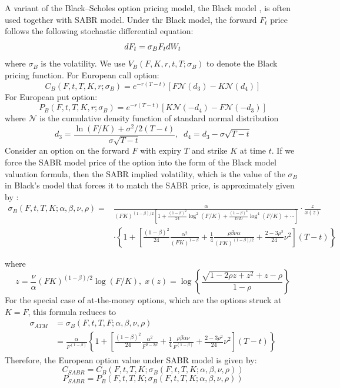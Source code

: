 \documentclass[letterpaper,12pt,titlepage,oneside,final]{book}
\numberwithin{equation}{section}
\theoremstyle{definition}
\begin{document}
A variant of the Black–Scholes option pricing model, the Black model \cite{black1976pricing}, is often used together with SABR model. Under thr Black model, the  forward $F_t$ price follows the following stochastic differential equation:
\[
dF_t=\sigma_B F_t dW_t\\
\]
where $\sigma_B$ is the volatility. We use $V_B(F,K,r,t,T;\sigma_{B})$ to denote the Black pricing function. For European call option:
\[
C_B(F,t,T,K,r;\sigma_{B})=e^{-r(T-t)}[F \mathcal{N} (d_3)-K  \mathcal{N} (d_4)]
\]
For European put option:
\[
P_B(F,t,T,K,r;\sigma_{B})=e^{-r(T-t)}[K  \mathcal{N} (-d_4)-F  \mathcal{N} (-d_3)]
\]
where $\mathcal{N}$ is the cumulative density function of standard normal distribution
\[
d_3=\frac{\ln(F/K)+\sigma^2/2(T-t)}{\sigma \sqrt{T-t}}, \;\; d_4=d_3-\sigma  \sqrt{T-t}
\]
Consider an option on the forward $F$ with expiry $T$ and strike $K$ at time $t$.
If we force the SABR model price of the option into the form of the Black model valuation formula, then the SABR implied volatility, which is the value of the $\sigma_B$ in Black's model that forces it to match the SABR price, is approximately given by \cite{hagan2002managing,bartlett2006hedging}:
\begin{equation}
\begin{split}
	\sigma_{B}(F,t,T,K;\alpha,\beta,\nu,\rho) =&
	\frac{\alpha}{(FK)^{(1-\beta)/2}\left[1+\frac{(1-\beta)^2}{24}\log^2(F/K)
		+ \frac{(1-\beta)^4}{1920}\log^4(F/K) + \cdots\right]} \cdot
	\frac{z}{x(z)}  \\
	&  \cdot \left\{1+\left[\frac{(1-\beta)^2}{24}\frac{\alpha^2}{(FK)^{1-\beta}}
	+ \frac{1}{4} \frac{\rho\beta\nu\alpha}{(FK)^{(1-\beta)/2}} +
	\frac{2-3\rho^2}{24}\nu^2 \right](T-t)\right\}
\end{split}
\label{eq:SABRExpansion}
\end{equation}

where
\[
z = \frac{\nu}{\alpha}(FK)^{(1-\beta)/2}\log (F/K),\; x(z) =
\log\left\{\frac{\sqrt{1-2\rho z + z^2}+z-\rho}{1-\rho}\right\}
\]
For the special case of at-the-money options, which are the options struck at $K=F$,
this formula reduces to
\[
\begin{split}
\sigma_{ATM} &= \sigma_{B}(F,t,T,F;\alpha,\beta,\nu,\rho) \\
&=
\frac{\alpha}{F^{(1-\beta)}}\left\{1 +
\left[\frac{(1-\beta)^2}{24}\frac{\alpha^2}{F^{2-2\beta}} +
\frac{1}{4}\frac{\rho\beta\alpha\nu}{F^{(1-\beta)}} +
\frac{2-3\rho^2}{24}\nu^2 \right] (T-t) \right\}
\end{split}
\]
Therefore, the European option value under SABR model is given by:
\[
C_{SABR}=C_B(F,t,T,K;\sigma_{B}(F,t,T,K;\alpha,\beta,\nu,\rho))
\]
\[
P_{SABR}=P_B(F,t,T,K;\sigma_{B}(F,t,T,K;\alpha,\beta,\nu,\rho))
\]
\end{document}
